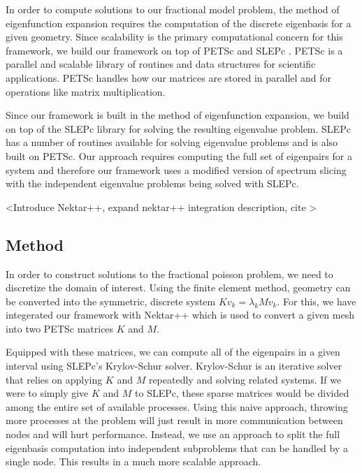 In order to compute solutions to our fractional model problem, the method of eigenfunction expansion requires the computation of the discrete eigenbasis for a given geometry. Since scalability is the primary computational concern for this framework, we build our framework on top of PETSc \cite{petsc-efficient} \cite{petsc-user-ref} and SLEPc \cite{slepc}. PETSc is a parallel and scalable library of routines and data structures for scientific applications. PETSc handles how our matrices are stored in parallel and for operations like matrix multiplication. 

Since our framework is built in the method of eigenfunction expansion, we build on top of the SLEPc library for solving the resulting eigenvalue problem. SLEPc has a number of routines available for solving eigenvalue problems and is also built on PETSc. Our approach requires computing the full set of eigenpairs for a system and therefore our framework uses a modified version of spectrum slicing with the independent eigenvalue problems being solved with SLEPc.

{\color{red} \noindent <Introduce Nektar++, expand nektar++ integration description, cite \cite{nektarpp}> }

\subsection{Method}

In order to construct solutions to the fractional poisson problem, we need to discretize the domain of interest. Using the finite element method, geometry can be converted into the symmetric, discrete system $ Kv_k = \lambda_k M v_k $. For this, we have integerated our framework with Nektar++ which is used to convert a given mesh into two PETSc matrices $K$ and $M$.

Equipped with these matrices, we can compute all of the eigenpairs in a given interval using SLEPc's Krylov-Schur solver. Krylov-Schur is an iterative solver that relies on applying $K$ and $M$ repeatedly and solving related systems. If we were to simply give $K$ and $M$ to SLEPc, these sparse  matrices would be divided among the entire set of available processes. Using this naive approach, throwing more processes at the problem will just result in more communication between nodes and will hurt performance. Instead, we use an approach to split the full eigenbasis computation into independent subproblems that can be handled by a single node. This results in a much more scalable approach.


